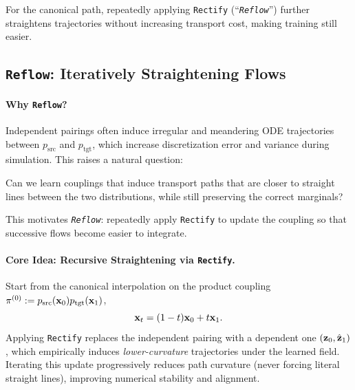 For the canonical path, repeatedly applying \texttt{Rectify} (``\emph{\texttt{Reflow}}'') further straightens trajectories without increasing transport cost, making training still easier.




\subsection{\texttt{Reflow}: Iteratively Straightening Flows}\label{subsec:reflow-def}

\paragraph{Why \texttt{Reflow}?}
Independent pairings often induce irregular and meandering ODE trajectories between $p_{\text{src}}$ and $p_{\text{tgt}}$, which increase discretization error and variance during simulation. This raises a natural question:

\begin{question}\label{ques:straight}
Can we learn couplings that induce transport paths that are closer to straight lines between the two distributions, while still preserving the correct marginals?
\end{question}

This motivates \emph{\texttt{Reflow}}: repeatedly apply \texttt{Rectify} to update the coupling so that successive flows become easier to integrate.

\paragraph{Core Idea: Recursive Straightening via \texttt{Rectify}.}
Start from the canonical interpolation on the product coupling $\pi^{(0)}:=p_{\text{src}}({\mathbf{x}}_0)p_{\text{tgt}}({\mathbf{x}}_1)$,
\[
{\mathbf{x}}_t = (1-t) {\mathbf{x}}_0 + t {\mathbf{x}}_1.
\]
Applying \texttt{Rectify} replaces the independent pairing with a dependent one $({\mathbf{z}}_0,\hat{{\mathbf{z}}}_1)$, which empirically induces \emph{lower-curvature} trajectories under the learned field. Iterating this update progressively reduces path curvature (never forcing literal straight lines), improving numerical stability and alignment.

